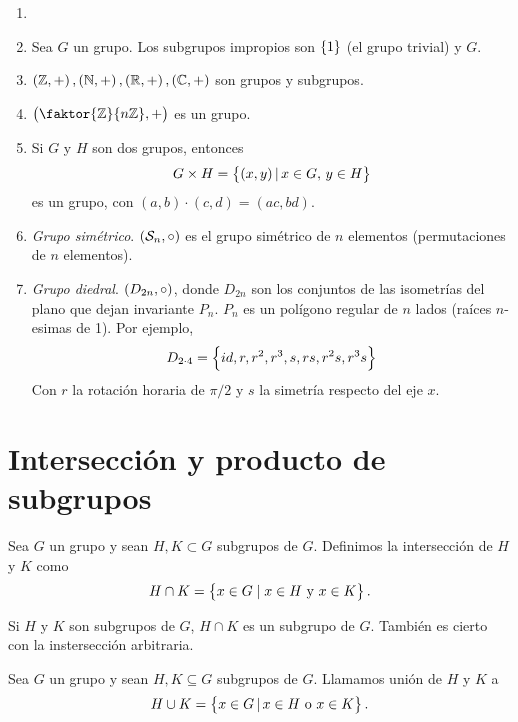 \begin{example}
    \begin{enumerate}[1.]
        \item[]
        \item Sea $G$ un grupo. Los subgrupos impropios son $\left\{1\right\}$ (el grupo trivial) y $G$.
        \item $\left( \mathbb{Z}, + \right), \left( \mathbb{N}, + \right), \left( \mathbb{R}, + \right), \left( \mathbb{C}, + \right)$ son grupos y subgrupos.
        \item $\lp \faktor{\z}{n\z}, + \rp$ es un grupo.
        \item Si $G$ y $H$ son dos grupos, entonces
            \[
                 G \times H = \left\{(x,y) \,\vert\, x \in G, \, y \in H\right\}   
            \]
            es un grupo, con $(a, b) \cdot (c, d) = (ac, bd)$.
        \item \emph{Grupo simétrico}. $\left( \mathcal{S}_n, \circ \right)$ es el grupo simétrico de $n$ elementos (permutaciones de $n$ elementos).
        \item \emph{Grupo diedral}. $\left( D_{2n}, \circ \right)$, donde $D_{2n}$ son los conjuntos de las isometrías del plano que dejan invariante $P_n$.
            $P_n$ es un polígono regular de $n$ lados (raíces $n$-esimas de 1). Por ejemplo,
            \[
                D_{2 \cdot 4} = \left\{id, r, r^2, r^3, s, rs, r^2s, r^3s\right\}
            \]
            Con $r$ la rotación horaria de $\pi / 2$ y $s$ la simetría respecto del eje $x$.
    \end{enumerate}
\end{example}

\section{Intersección y producto de subgrupos}

\begin{defi}
    Sea $G$ un grupo y sean $H, K \subset G$ subgrupos de $G$. Definimos la intersección de
    $H$ y $K$ como
    \[
        H \cap K = \left\{x \in G \; \vert \; x \in H \text{ y } x \in K\right\}.
    \]
\end{defi}

\begin{obs}
    Si $H$ y $K$ son subgrupos de $G$, $H \cap K$ es un subgrupo de $G$.
    También es cierto con la instersección arbitraria.
\end{obs}

\begin{defi}
    Sea $G$ un grupo y sean $H, K \subseteq G$ subgrupos de $G$. Llamamos unión de $H$ y $K$ a
    \[
        H \cup K = \left\{x \in G \, \vert\, x \in H \text{ o } x \in K\right\}.
    \]
\end{defi}

